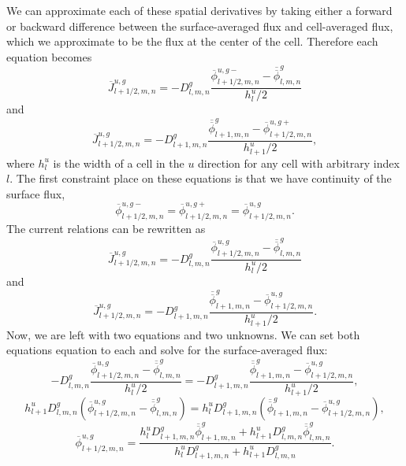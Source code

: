 \documentclass{ansconf}
\numberwithin{equation}{section}
\begin{document}
We can approximate each of these spatial derivatives by taking either a forward or backward difference between the surface-averaged flux
and cell-averaged flux, which we approximate to be the flux at the
center of the cell. Therefore each equation becomes
\begin{equation}
\overline{J}^{u,g}_{l+1/2,m,n}=-D_{l,m,n}^{g}\frac{
\overline{\phi}^{u,g-}_{l+1/2,m,n}-
\overline{\overline{\phi}}_{l,m,n}^{g}}{h_{l}^{u}/2}
\end{equation}
and 
\begin{equation}
\overline{J}^{u,g}_{l+1/2,m,n}=-D_{l+1,m,n}^{g}\frac{\overline{\overline{\phi}}_{l+1,m,n}^{g}-
\overline{\phi}^{u,g+}_{l+1/2,m,n}}{h_{l+1}^{u}/2},
\end{equation}
where $h_{l}^{u}$ is the width of a cell in the $u$ direction for any cell with arbitrary index $l$. The first constraint place on these equations is that we have continuity of the surface flux,
\begin{equation}
\overline{\phi}^{u,g-}_{l+1/2,m,n}=\overline{\phi}^{u,g+}
_{l+1/2,m,n}=\overline{\phi}^{u,g}_{l+1/2,m,n}.
\end{equation}
The current relations can be rewritten as
\begin{equation}
\overline{J}_{l+1/2,m,n}^{u,g}=-D_{l,m,n}^{g}\frac{\overline{\phi}^{u,g}_{l+1/2,m,n}-
\overline{\overline{\phi}}_{l,m,n}^{g}}{h_{l}^{u}/2}
\end{equation}
and
\begin{equation}
\overline{J}^{u,g}_{l+1/2,m,n}=-D_{l+1,m,n}^{g}\frac{\overline{\overline{\phi}}_{l+1,m,n}^{g}-
\overline{\phi}^{u,g}_{l+1/2,m,n}}{h_{l+1}^{u}/2}.
\end{equation}
Now, we are left with two equations and two unknowns. We can set
both equations equation to each and solve for the surface-averaged flux:
\begin{equation}
-D_{l,m,n}^{g}\frac{\overline{\phi}^{u,g}_{l+1/2,m,n}-
\overline{\overline{\phi}}_{l,m,n}^{g}}{h_{l}^{u}/2}=-D_{l+1,m,n}^{g}\frac{\overline{\overline{\phi}}_{l+1,m,n}^{g}-
\overline{\phi}^{u,g}_{l+1/2,m,n}}{h_{l+1}^{u}/2},
\end{equation}
\begin{equation}
h_{l+1}^{u}D_{l,m,n}^{g}\left(\overline{\phi}^{u,g}_{l+1/2,m,n}
-\overline{\overline{\phi}}_{l,m,n}^{g}\right)=h_{l}^{u}
D_{l+1,m,n}^{g}\left(\overline{\overline{\phi}}_{l+1,m,n}^{g}-
\overline{\phi}^{u,g}_{l+1/2,m,n}\right),
\end{equation}
\begin{equation}
\overline{\phi}^{u,g}_{l+1/2,m,n}=\frac{h_{l}^{u}
D_{l+1,m,n}^{g}\overline{\overline{\phi}}_{l+1,m,n}^{g}
+h_{l+1}^{u}D_{l,m,n}^{g}\overline{\overline{\phi}}_{l,m,n}^{g}}{h_{l}^{u}D_{l+1,m,n}^{g}+h_{l+1}^{u}D_{l,m,n}^{g}}.
\end{equation}
\end{document}
